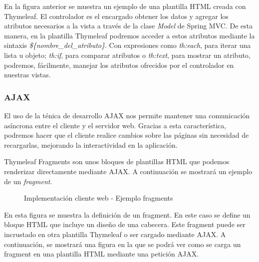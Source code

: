 En la figura anterior se muestra un ejemplo de una plantilla HTML creada con Thymeleaf. El controlador es el encargado obtener los datos y agregar los atributos necesarios a la vista a través de la clase \textit{Model} de Spring MVC. De esta manera, en la plantilla Thymeleaf podremos acceder a estos atributos mediante la sintaxis \textit{\$\{nombre\_del\_atributo\}}. Con expresiones como \textit{th:each}, para iterar una lista u objeto; \textit{th:if}, para comparar atributos o \textit{th:text}, para mostrar un atributo, podremos, fácilmente, manejar los atributos ofrecidos por el controlador en nuestras vistas. 


\subsubsection*{AJAX}
El uso de la ténica de desarrollo AJAX nos permite mantener una comunicación asíncrona entre el cliente y el servidor web. Gracias a esta característica, podremos hacer que el cliente realice cambios sobre las páginas sin necesidad de recargarlas, mejorando la interactividad en la aplicación.

Thymeleaf Fragments son unos bloques de plantillas HTML que podemos renderizar directamente mediante AJAX. A continuación se mostrará un ejemplo de un \textit{fragment}.

\begin{figure}[H]
\centering
{}
\caption{Implementación cliente web - Ejemplo fragments}
\end{figure}

En esta figura se muestra la definición de un fragment. En este caso se define un bloque HTML que incluye un diseño de una cabecera. Este fragment puede ser incrustado en otra plantilla Thymeleaf o ser cargado mediante AJAX. A continuación, se mostrará una figura en la que se podrá ver como se carga un fragment en una plantilla HTML mediante una petición AJAX.

